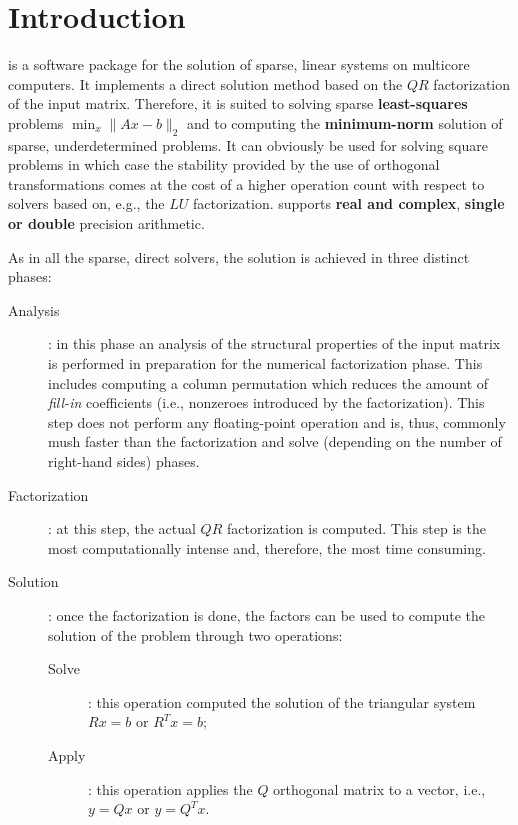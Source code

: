 \documentclass[11pt]{article}
\begin{document}


\newpage

\tableofcontents
\newpage

\section{Introduction}
\label{sec:intro}

\qrm is a software package for the solution of sparse, linear systems
on multicore computers. It implements a direct solution method based
on the $QR$ factorization of the input matrix. Therefore, it is suited
to solving sparse {\bf least-squares} problems $\min_x\|Ax-b\|_2$ and
to computing the {\bf minimum-norm} solution of sparse,
underdetermined problems. It can obviously be used for solving square
problems in which case the stability provided by the use of orthogonal
transformations comes at the cost of a higher operation count with
respect to solvers based on, e.g., the $LU$ factorization. \qrm
supports {\bf real and complex}, {\bf single or double} precision
arithmetic.

As in all the sparse, direct solvers, the solution is achieved in
three distinct phases:
\begin{description}
\item[Analysis]: in this phase an analysis of the structural properties
  of the input matrix is performed in preparation for the numerical
  factorization phase. This includes computing a column permutation
  which reduces the amount of {\it fill-in} coefficients (i.e.,
  nonzeroes introduced by the factorization). This step does not
  perform any floating-point operation and is, thus, commonly mush
  faster than the factorization and solve (depending on the number of
  right-hand sides) phases.
\item[Factorization]: at this step, the actual $QR$ factorization is
  computed. This step is the most computationally intense and,
  therefore, the most time consuming.
\item[Solution]: once the factorization is done, the factors can be used
  to compute the solution of the problem through two operations:
  \begin{description}
  \item[Solve] : this operation computed the solution of the
    triangular system $Rx=b$ or $R^Tx=b$;
  \item[Apply] : this operation applies the $Q$ orthogonal matrix to a
    vector, i.e., $y = Qx$ or $y = Q^Tx$.
  \end{description}
\end{description}
\end{document}
